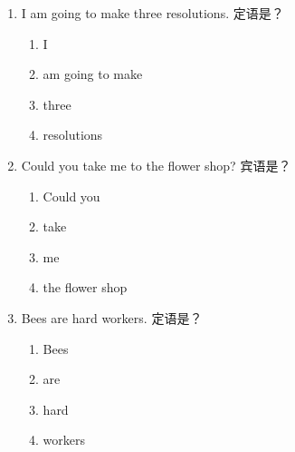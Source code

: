 \documentclass[11pt,a4paper]{ctexart}
\begin{document}
\begin{enumerate}[leftmargin=*,itemsep=4pt]
\begin{enumerate}[label=\Alph*.,leftmargin=2em,itemsep=1pt,topsep=2pt]
\item nine
\end{enumerate}
\item I am going to make three resolutions. 定语是？
\begin{enumerate}[label=\Alph*.,leftmargin=2em,itemsep=1pt,topsep=2pt]
\item I
\item am going to make
\item three
\item resolutions
\end{enumerate}
\item Could you take me to the flower shop? 宾语是？
\begin{enumerate}[label=\Alph*.,leftmargin=2em,itemsep=1pt,topsep=2pt]
\item Could you
\item take
\item me
\item the flower shop
\end{enumerate}
\item Bees are hard workers. 定语是？
\begin{enumerate}[label=\Alph*.,leftmargin=2em,itemsep=1pt,topsep=2pt]
\item Bees
\item are
\item hard
\item workers
\end{enumerate}
\end{enumerate}
\end{document}
